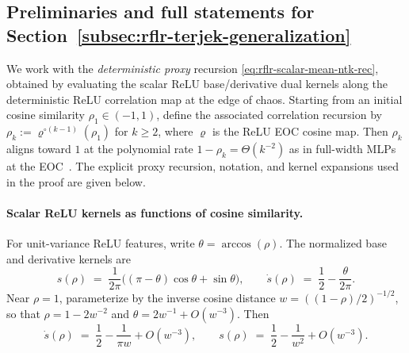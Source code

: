 \subsection{Preliminaries and full statements for Section~\ref{subsec:rflr-terjek-generalization}}\label{appendix:mean-depth-theorem-preliminaries}
We work with the \emph{deterministic proxy} recursion \eqref{eq:rflr-scalar-mean-ntk-rec}, obtained by evaluating the scalar ReLU base/derivative dual kernels along the deterministic ReLU correlation map at the edge of chaos. Starting from an initial cosine similarity \(\rho_1\in(-1,1)\), define the associated correlation recursion by \(\rho_k:=\varrho^{\circ(k-1)}(\rho_1)\) for \(k\ge 2\), where \(\varrho\) is the ReLU EOC cosine map. Then \(\rho_k\) aligns toward \(1\) at the polynomial rate \(1-\rho_k=\Theta(k^{-2})\) as in full-width MLPs at the EOC~\cite{terjek2025mlpsateoc,pmlr-v163-hayou22a}. The explicit proxy recursion, notation, and kernel expansions used in the proof are given below.

\paragraph{Scalar ReLU kernels as functions of cosine similarity.}
For unit-variance ReLU features, write \( \theta=\arccos(\rho) \). The normalized base and derivative kernels are
\[
s(\rho) \;=\; \frac{1}{2\pi}\bigl((\pi-\theta)\cos\theta + \sin\theta\bigr),
\qquad
\dot{s}(\rho) \;=\; \frac{1}{2}-\frac{\theta}{2\pi}.
\]
Near \( \rho=1 \), parameterize by the inverse cosine distance \( w=((1-\rho)/2)^{-1/2} \), so that \( \rho = 1-2w^{-2} \) and \( \theta = 2w^{-1}+O(w^{-3}) \). Then
\begin{equation}\label{eq:relu-kernel-expansions-w}
\dot{s}(\rho) \;=\; \frac{1}{2}-\frac{1}{\pi w}+O(w^{-3}),
\qquad
s(\rho)\;=\;\frac{1}{2}-\frac{1}{w^{2}}+O(w^{-3}).
\end{equation}

